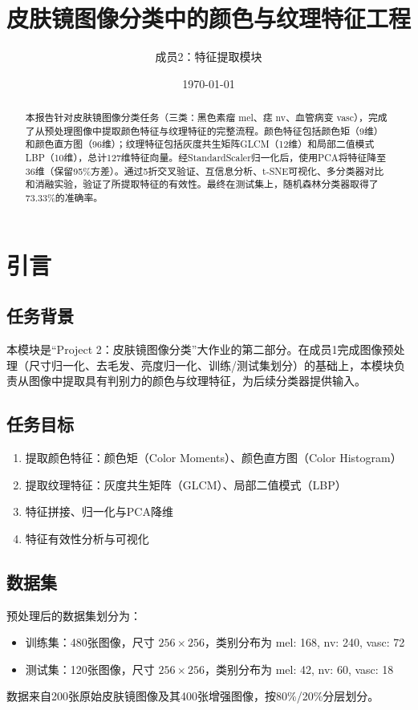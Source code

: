 \documentclass[12pt,a4paper]{ctexart}
\title{\textbf{皮肤镜图像分类中的颜色与纹理特征工程}}
\author{成员2：特征提取模块}
\date{\today}
\begin{document}
\maketitle

\begin{abstract}
本报告针对皮肤镜图像分类任务（三类：黑色素瘤 mel、痣 nv、血管病变 vasc），完成了从预处理图像中提取颜色特征与纹理特征的完整流程。颜色特征包括颜色矩（9维）和颜色直方图（96维）；纹理特征包括灰度共生矩阵GLCM（12维）和局部二值模式LBP（10维），总计127维特征向量。经StandardScaler归一化后，使用PCA将特征降至36维（保留95\%方差）。通过5折交叉验证、互信息分析、t-SNE可视化、多分类器对比和消融实验，验证了所提取特征的有效性。最终在测试集上，随机森林分类器取得了73.33\%的准确率。
\end{abstract}

\section{引言}

\subsection{任务背景}
本模块是“Project 2：皮肤镜图像分类”大作业的第二部分。在成员1完成图像预处理（尺寸归一化、去毛发、亮度归一化、训练/测试集划分）的基础上，本模块负责从图像中提取具有判别力的颜色与纹理特征，为后续分类器提供输入。

\subsection{任务目标}
\begin{enumerate}[label=(\arabic*)]
    \item 提取颜色特征：颜色矩（Color Moments）、颜色直方图（Color Histogram）
    \item 提取纹理特征：灰度共生矩阵（GLCM）、局部二值模式（LBP）
    \item 特征拼接、归一化与PCA降维
    \item 特征有效性分析与可视化
\end{enumerate}

\subsection{数据集}
预处理后的数据集划分为：
\begin{itemize}
    \item 训练集：480张图像，尺寸 $256 \times 256$，类别分布为 mel: 168, nv: 240, vasc: 72
    \item 测试集：120张图像，尺寸 $256 \times 256$，类别分布为 mel: 42, nv: 60, vasc: 18
\end{itemize}
数据来自200张原始皮肤镜图像及其400张增强图像，按80\%/20\%分层划分。
\end{document}

